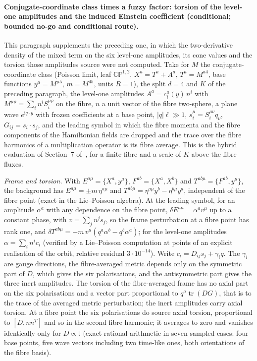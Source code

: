 \paragraph{Conjugate-coordinate class times a fuzzy factor: torsion of the level-one amplitudes and the induced Einstein coefficient (conditional; bounded no-go and conditional route).}
This paragraph supplements the preceding one, in which the two-derivative density of the mixed term on the six level-one amplitudes, its cone values and the torsion those amplitudes source were not computed. Take for \(M\) the conjugate-coordinate class (Poisson limit, leaf \(\mathbb{CP}^{1,2}\), \(X^a=T^a+A^a\), \(T^a=M^{a4}\), base functions \(y^\mu=M^{\mu5}\), \(m=M^{45}\), units \(R=1\)), the split \(d=4\) and \(K\) of the preceding paragraph, the level-one amplitudes \(A^a=c_i^a(y)\,n^i\) with \(M^{\mu\rho}=\sum_in^iS_i^{\mu\rho}\) on the fibre, \(n\) a unit vector of the fibre two-sphere, a plane wave \(e^{\mathrm iq\cdot y}\) with frozen coefficients at a base point, \(|q|\ell\gg1\), \(s_i^\mu=S_i^{\mu\nu}q_\nu\), \(G_{ij}=s_i\cdot s_j\), and the leading symbol in which the fibre momenta and the fibre components of the Hamiltonian fields are dropped and the trace over the fibre harmonics of a multiplication operator is its fibre average. This is the hybrid evaluation of Section~7 of~\cite{Steinacker2023}, for a finite fibre and a scale of \(K\) above the fibre fluxes.

\emph{Frame and torsion.} With \(E^{a\mu}=\{X^a,y^\mu\}\), \(F^{ab}=\{X^a,X^b\}\) and \(T^{ab\mu}=\{F^{ab},y^\mu\}\), the background has \(E^{a\mu}=\pm m\,\eta^{a\mu}\) and \(T^{ab\mu}=\eta^{a\mu}y^b-\eta^{b\mu}y^a\), independent of the fibre point (exact in the Lie--Poisson algebra). At the leading symbol, for an amplitude \(\alpha^a\) with any dependence on the fibre point, \(\delta E^{a\mu}=\alpha^a v^\mu\) up to a constant phase, with \(v=\sum_jn^js_j\), so the frame perturbation at a fibre point has rank one, and \(\delta T^{ab\mu}=-m\,v^\mu(q^a\alpha^b-q^b\alpha^a)\); for the level-one amplitudes \(\alpha=\sum_in^ic_i\) (verified by a Lie--Poisson computation at points of an explicit realisation of the orbit, relative residual \(3\cdot10^{-14}\)). Write \(c_i=D_{ij}s_j+\gamma_iq\). The \(\gamma_i\) are gauge directions, the fibre-averaged metric depends only on the symmetric part of \(D\), which gives the six polarisations, and the antisymmetric part gives the three inert amplitudes. The torsion of the fibre-averaged frame has no axial part on the six polarisations and a vector part proportional to \(q^a\operatorname{tr}(DG)\), that is to the trace of the averaged metric perturbation; the inert amplitudes carry axial torsion. At a fibre point the six polarisations do source axial torsion, proportional to \([D,nn^{T}]\) and so in the second fibre harmonic; it averages to zero and vanishes identically only for \(D\propto\mathbb I\) (exact rational arithmetic in seven sampled cases: four base points, five wave vectors including two time-like ones, both orientations of the fibre basis).

